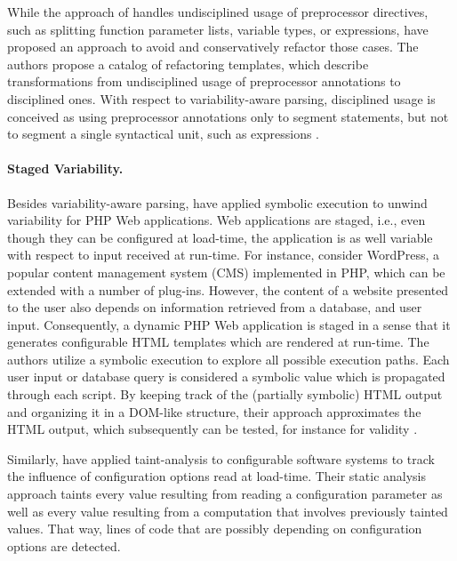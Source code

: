 While the approach of \cite{kastner_variability-aware_2011} handles
undisciplined usage of preprocessor directives, such as splitting function parameter lists, variable types, or
expressions, \cite{medeiros_discipline_2017} have proposed an approach to avoid and
conservatively refactor those cases. The authors propose a catalog of
refactoring templates, which describe transformations from undisciplined usage
of preprocessor annotations to disciplined ones. With respect to
variability-aware parsing, disciplined usage is conceived as using preprocessor
annotations only to segment statements, but not to segment a single syntactical
unit, such as expressions \citep{medeiros_discipline_2017}.

\paragraph{Staged Variability.} Besides variability-aware parsing,
\cite{nguyen_building_2014} have applied symbolic execution
\citep{king_symbolic_1976,darringer_applications_1978} to unwind variability for
PHP Web applications. Web applications are staged, i.e., even though they can be
configured at load-time, the application is as well variable with respect to
input received at run-time. For instance, consider WordPress, a popular content
management system (CMS) implemented in PHP, which can be extended with a number
of plug-ins. However, the content of a website presented to the user also depends
on information retrieved from a database, and user input. Consequently, a
dynamic PHP Web application is staged in a sense that it generates configurable
HTML templates which are rendered at run-time. The authors utilize a symbolic
execution to explore all possible execution paths. Each user input or database
query is considered a symbolic value which is propagated through each script.
By keeping track of the (partially symbolic) HTML output and organizing it in a
DOM-like structure, their approach approximates the HTML output, which
subsequently can be tested, for instance for validity
\citep{nguyen_auto-locating_2011}.

Similarly, \cite{lillack_tracking_2014} have applied taint-analysis to configurable software
systems to track the influence of configuration options read at load-time.
Their static analysis approach taints every value resulting from reading a
configuration parameter as well as every value resulting from a computation
that involves previously tainted values. That way, lines of code that are
possibly depending on configuration options are detected.

